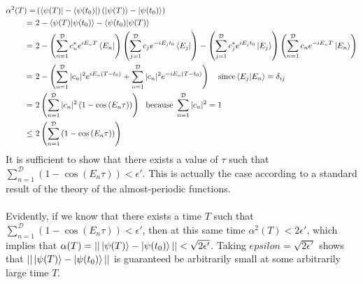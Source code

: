 \documentclass[a4paper,10pt]{article}
\begin{document}
\begin{align*}
 \alpha^2(T)=&\left(\bra {\psi(T)}-\bra {\psi(t_0)}\right)\left(\ket{\psi(T)}-\ket{\psi(t_0)}\right) \\
 = \ &2-\braket{\psi(T)|\psi(t_0)}-\braket{\psi(t_0)|\psi(T)} \\
 = \ &2-\left(\sum_{n=1}^{\mathcal{D}}c_n^* e^{iE_{n}T}\bra{E_n}\right)\left(\sum_{j=1}^{\mathcal{D}}c_je^{-iE_{j}t_{0}}\bra{E_j}\right)-\left(\sum_{j=1}^{\mathcal{D}}c_j^*e^{iE_{j}t_{0}}\ket{E_j}\right)\left(\sum_{n=1}^{\mathcal{D}}c_n e^{-iE_{n}T}\ket{E_n}\right) \\
 = \ &2-\left(\sum_{n=1}^\mathcal{D} |c_n|^2 e^{iE_{n}(T-t_0)}+\sum_{n=1}^\mathcal{D} |c_n|^2 e^{-iE_{n}(T-t_0)}\right) \ \ \ \text{since} \braket{E_j|E_n}=\delta_{ij} \\
 = \ &2\left(\sum_{n=1}^\mathcal{D} |c_n|^2\left(1-\cos\left(E_{n}\tau\right) \right) \right) \ \ \text{because}  \ \sum_{n=1}^\mathcal{D} |c_n|^2=1 \\
 \leq\ &2\left(\sum_{n=1}^\mathcal{D}\left(1-\cos\left(E_{n}\tau\right) \right) \right)
\end{align*}
It is sufficient to show that there exists a value of $\tau$ such that $\sum_{n=1}^\mathcal{D}\left(1-\cos\left(E_{n}\tau\right) \right)<\epsilon'$. This is actually the case 
according to a standard result of the theory of the almost-periodic functions.
\\\\
Evidently, if we know that there exists a time $T$ such that $\sum_{n=1}^\mathcal{D}\left(1-\cos\left(E_{n}\tau\right) \right)<\epsilon'$, then at this same time $\alpha^2(T)<2\epsilon'$, which implies 
that $\alpha(T)=||\ket{\psi(T)}-\ket{\psi(t_0)}||<\sqrt{2\epsilon'}$. Taking $epsilon=\sqrt{2\epsilon'}$ shows that $||\ket{\psi(T)}-\ket{\psi(t_0)}||$ is guaranteed be arbitrarily small at some 
arbitrarily large time $T$.
\end{document}

